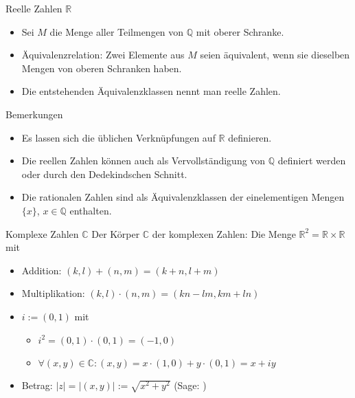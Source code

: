 \documentclass[notes=hide,hyperref={dvipdfmx,pdfpagelabels=false}]{beamer}
\begin{document}
\begin{frame}{Reelle Zahlen $\mathbb{R}$}
\begin{itemize}
\item Sei $M$ die Menge aller Teilmengen von $\mathbb{Q}$ mit oberer
Schranke.
\item Äquivalenzrelation: Zwei Elemente aus $M$ seien äquivalent, wenn sie dieselben
Mengen von oberen Schranken haben. 
\item Die entstehenden Äquivalenzklassen nennt man {\color{red} reelle
Zahlen}.
\end{itemize}
Bemerkungen
\begin{itemize}
\item Es lassen sich die üblichen Verknüpfungen auf $\mathbb{R}$
definieren. 
\item Die reellen Zahlen können auch als Vervollständigung von
$\mathbb{Q}$ definiert werden oder durch den Dedekindschen Schnitt.
\item Die rationalen Zahlen sind als Äquivalenzklassen der
einelementigen Mengen $\{ x \}$, $x \in \mathbb{Q}$ enthalten.

 \end{itemize}
\end{frame}






\begin{frame}{Komplexe Zahlen $\mathbb{C}$}
Der Körper $\mathbb{C}$ der {\color{red} komplexen Zahlen}:
Die Menge $\mathbb{R}^2=\mathbb{R} \times \mathbb{R}$ mit 
\begin{itemize}
 \item   Addition: $(k,l)+(n,m)=(k+n,l+m)$
\item Multiplikation:  $ (k,l) \cdot (n,m) = (kn-lm, km+ln) $
\end{itemize}

\begin{itemize}
 \item {\color{red} $i:=(0,1)$}  mit 
\begin{itemize}
\item $ i^2=(0,1) \cdot (0,1) = (-1,0) $
\item $\forall (x,y) \in \mathbb{C}:  (x,y)=x \cdot (1,0) + y \cdot (0,1)= x +i y$
\end{itemize}
\item \alert{Betrag}: $|z|=|(x,y)|:=\sqrt{x^2+y^2}$ (Sage: )
\end{itemize}

\end{frame}
\end{document}
